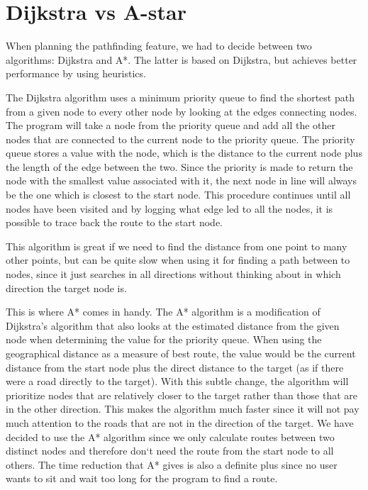 \section{Dijkstra vs A-star}
\label{IMPL-DVA}
When planning the pathfinding feature, we had to decide between two algorithms: 
Dijkstra and A*. The latter is based on Dijkstra, but achieves better performance by 
using heuristics.

The Dijkstra algorithm uses a minimum priority queue to find the shortest path 
from a given node to every other node by looking at the edges connecting nodes. 
The program will take a node from the priority queue and add all the other nodes 
that are connected to the current node to the priority queue. The priority queue 
stores a value with the node, which is the distance to the current node 
plus the length of the edge between the two. Since the priority is made to return 
the node with the smallest value associated with it, the next node in line will 
always be the one which is closest to the start node. This procedure continues 
until all nodes have been visited and by logging what edge led to all the nodes, 
it is possible to trace back the route to the start node.

This algorithm is great if we need to find the distance from one point to many other 
points, but can be quite slow when using it for finding a path between to nodes, 
since it just searches in all directions without thinking about in which direction the 
target node is.

This is where A* comes in handy. The A* algorithm is a modification of Dijkstra's 
algorithm that also looks at the estimated distance from the given node when 
determining the value for the priority queue. When using the geographical distance 
as a measure of best route, the value would be the current distance from the start 
node plus the direct distance to the target (as if there were a road directly to 
the target). With this subtle change, the algorithm will prioritize nodes that are 
relatively closer to the target rather than those that are in the other
direction. This makes the algorithm much faster since it will not pay much attention 
to the roads that are not in the direction of the target.
We have decided to use the A* algorithm since we only calculate routes between 
two distinct nodes and therefore don`t need the route from the start node to all 
others. The time reduction that A* gives is also a definite plus since no user 
wants to sit and wait too long for the program to find a route.


